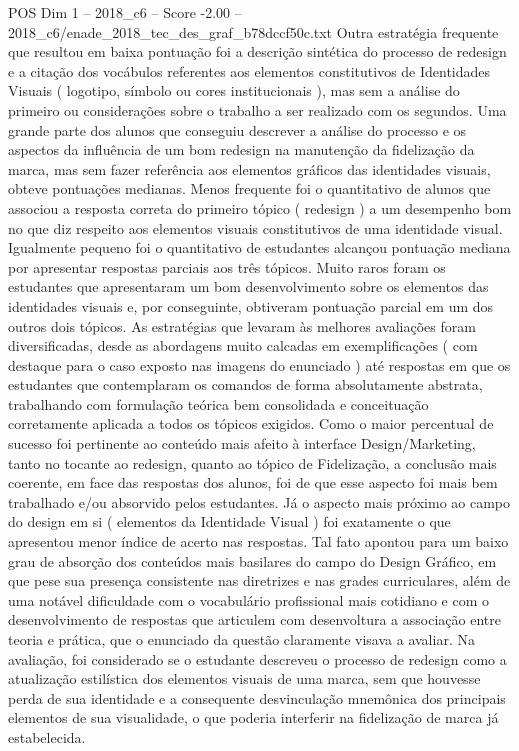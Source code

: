 \begin{textsample}{POS Dim 1 – 2018\_c6 – Score -2.00 – 2018\_c6/enade\_2018\_tec\_des\_graf\_b78dccf50c.txt}
Outra estratégia frequente que resultou em baixa pontuação foi a descrição sintética do processo de redesign e a citação dos vocábulos referentes aos elementos constitutivos de Identidades Visuais ( logotipo, símbolo ou cores institucionais ), mas sem a análise do primeiro ou considerações sobre o trabalho a ser realizado com os segundos.
Uma grande parte dos alunos que conseguiu descrever a análise do processo e os aspectos da influência de um bom redesign na manutenção da fidelização da marca, mas sem fazer referência aos elementos gráficos das identidades visuais, obteve pontuações medianas.
Menos frequente foi o quantitativo de alunos que associou a resposta correta do primeiro tópico ( redesign ) a um desempenho bom no que diz respeito aos elementos visuais constitutivos de uma identidade visual.
Igualmente pequeno foi o quantitativo de estudantes alcançou pontuação mediana por apresentar respostas parciais aos três tópicos.
Muito raros foram os estudantes que apresentaram um bom desenvolvimento sobre os elementos das identidades visuais e, por conseguinte, obtiveram pontuação parcial em um dos outros dois tópicos.
As estratégias que levaram às melhores avaliações foram diversificadas, desde as abordagens muito calcadas em exemplificações ( com destaque para o caso exposto nas imagens do enunciado ) até respostas em que os estudantes que contemplaram os comandos de forma absolutamente abstrata, trabalhando com formulação teórica bem consolidada e conceituação corretamente aplicada a todos os tópicos exigidos.
Como o maior percentual de sucesso foi pertinente ao conteúdo mais afeito à interface Design/Marketing, tanto no tocante ao redesign, quanto ao tópico de Fidelização, a conclusão mais coerente, em face das respostas dos alunos, foi de que esse aspecto foi mais bem trabalhado e/ou absorvido pelos estudantes.
Já o aspecto mais próximo ao campo do design em si ( elementos da Identidade Visual ) foi exatamente o que apresentou menor índice de acerto nas respostas.
Tal fato apontou para um baixo grau de absorção dos conteúdos mais basilares do campo do Design Gráfico, em que pese sua presença consistente nas diretrizes e nas grades curriculares, além de uma notável dificuldade com o vocabulário profissional mais cotidiano e com o desenvolvimento de respostas que articulem com desenvoltura a associação entre teoria e prática, que o enunciado da questão claramente visava a avaliar.
Na avaliação, foi considerado se o estudante descreveu o processo de redesign como a atualização estilística dos elementos visuais de uma marca, sem que houvesse perda de sua identidade e a consequente desvinculação mnemônica dos principais elementos de sua visualidade, o que poderia interferir na fidelização de marca já estabelecida.

\end{textsample}

